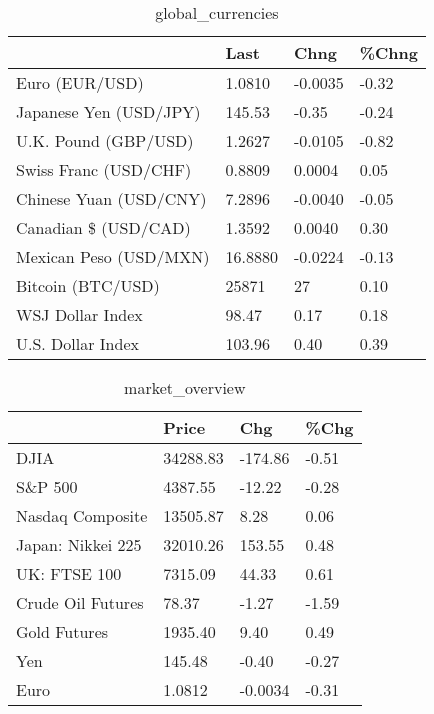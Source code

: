 \documentclass{article}%
\begin{document}
%


\begin{table}[htbp]%
\caption{global\_currencies}%
\centering%
\begin{adjustbox}{width=1\textwidth}%
\begin{tabular}{llll}
\toprule
                       &    Last &    Chng & \%Chng \\
\midrule
        Euro (EUR/USD) &  1.0810 & -0.0035 & -0.32 \\
Japanese Yen (USD/JPY) &  145.53 &   -0.35 & -0.24 \\
  U.K. Pound (GBP/USD) &  1.2627 & -0.0105 & -0.82 \\
 Swiss Franc (USD/CHF) &  0.8809 &  0.0004 &  0.05 \\
Chinese Yuan (USD/CNY) &  7.2896 & -0.0040 & -0.05 \\
  Canadian \$ (USD/CAD) &  1.3592 &  0.0040 &  0.30 \\
Mexican Peso (USD/MXN) & 16.8880 & -0.0224 & -0.13 \\
     Bitcoin (BTC/USD) &   25871 &      27 &  0.10 \\
      WSJ Dollar Index &   98.47 &    0.17 &  0.18 \\
     U.S. Dollar Index &  103.96 &    0.40 &  0.39 \\
\bottomrule
\end{tabular}
%
\end{adjustbox}%
\end{table}

%


\begin{table}[htbp]%
\caption{market\_overview}%
\centering%
\begin{adjustbox}{width=1\textwidth}%
\begin{tabular}{llll}
\toprule
                  &    Price &     Chg &  \%Chg \\
\midrule
             DJIA & 34288.83 & -174.86 & -0.51 \\
          S\&P 500 &  4387.55 &  -12.22 & -0.28 \\
 Nasdaq Composite & 13505.87 &    8.28 &  0.06 \\
Japan: Nikkei 225 & 32010.26 &  153.55 &  0.48 \\
     UK: FTSE 100 &  7315.09 &   44.33 &  0.61 \\
Crude Oil Futures &    78.37 &   -1.27 & -1.59 \\
     Gold Futures &  1935.40 &    9.40 &  0.49 \\
              Yen &   145.48 &   -0.40 & -0.27 \\
             Euro &   1.0812 & -0.0034 & -0.31 \\
\bottomrule
\end{tabular}
%
\end{adjustbox}%
\end{table}

%
\end{document}
